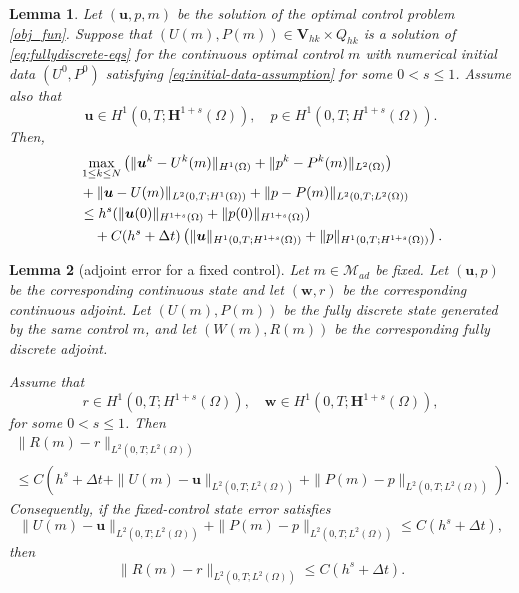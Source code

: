\documentclass[10pt,a4paper]{amsart}
\newtheorem{lemma}{Lemma}
\newcommand{\LRp}[1]{\left( #1 \right)}
\begin{document}
\begin{lemma}\label{lemma:aux-forward-error}
	Let $({\boldsymbol{u}},{p},{m})$ be the solution of the optimal control problem \eqref{obj_fun}. Suppose that $(U({m}), P({m})) \in \boldsymbol{V}_{hk} \times Q_{hk}$ is a solution of \eqref{eq:fullydiscrete-eqs} for the continuous optimal control ${m}$ with numerical initial data $(U^0, P^0)$ satisfying \eqref{eq:initial-data-assumption} for some $0<s\le 1$. Assume also that 
    \[
        \boldsymbol{u}\in H^1(0,T;\boldsymbol{H}^{1+s}(\Omega)), \quad  p\in H^1(0,T;H^{1+s}(\Omega)).
    \]
    Then, 
	\begin{align}
        \label{eq:forward-aux-estimate}
		&\max_{1\le k \le N} \LRp{\| \boldsymbol{u}^k - U^k(m)\|_{H^1(\Omega)} + \| p^k - P^k(m)\|_{L^2(\Omega)} } 
        \\
        \notag
		&+ \| \boldsymbol{u} - U(m)\|_{L^2(0,T; H^1(\Omega))} + \| p - P(m)\|_{L^2(0,T; L^2(\Omega))} 
        \\
        \notag
        &\le h^{s}(\|\boldsymbol{u}(0)\|_{H^{1+s}(\Omega)}+\|p(0)\|_{H^{1+s}(\Omega)}) 
        \\
        \notag
        &\quad + C(h^s+\Delta t)
        \left(
        \|\boldsymbol{u}\|_{H^1(0,T;H^{1+s}(\Omega))}
        +
        \|p\|_{H^1(0,T;H^{1+s}(\Omega))}
        \right) .
    \end{align}
\end{lemma}

\begin{lemma}[adjoint error for a fixed control]
\label{lem:adjoint-error-fixed-control}
Let $m\in \mathcal{M}_{ad}$ be fixed. Let $(\boldsymbol{u},p)$ be the
corresponding continuous state and let $(\boldsymbol{w},r)$ be the
corresponding continuous adjoint. Let $(U(m),P(m))$ be the fully
discrete state generated by the same control $m$, and let
$(W(m),R(m))$ be the corresponding fully discrete adjoint.

Assume that
\[
 r\in H^1(0,T;H^{1+s}(\Omega)),
 \quad 
 \boldsymbol{w}\in H^1(0,T;\boldsymbol{H}^{1+s}(\Omega)),
\]
for some $0<s\le 1$. Then
%
\begin{multline}
    \|R(m)-r\|_{L^2(0,T;L^2(\Omega))} 
    \\
    \le C\left( h^s+\Delta t + \|U(m)-\boldsymbol{u}\|_{L^2(0,T;L^2(\Omega))} +\|P(m)-p\|_{L^2(0,T;L^2(\Omega))} \right).
\end{multline}
%
Consequently, if the fixed-control state error satisfies
\[
\|U(m)-\boldsymbol{u}\|_{L^2(0,T;L^2(\Omega))}
+ \|P(m)-p\|_{L^2(0,T;L^2(\Omega))} \le C(h^s+\Delta t),
\]
then
\[
\|R(m)-r\|_{L^2(0,T;L^2(\Omega))} \le C(h^s+\Delta t).
\]
\end{lemma}
\end{document}
